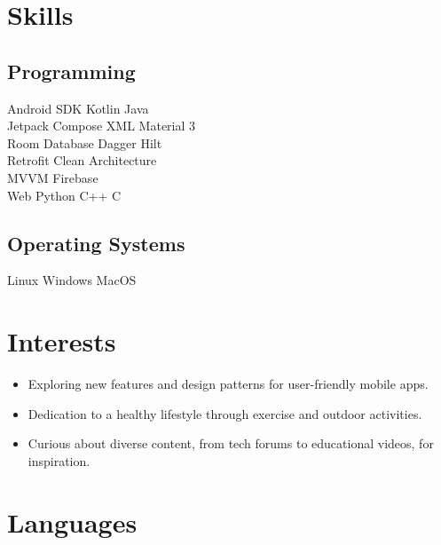 \documentclass[bold]{deedy-resume-openfont}
\begin{document}
\begin{minipage}[t]{0.33\textwidth}

\section{Skills}
\subsection{Programming}
Android SDK \textbullet{} Kotlin \textbullet{} Java \\
Jetpack Compose \textbullet{} XML \textbullet{} Material 3  \\
Room Database \textbullet{} Dagger Hilt \\ 
Retrofit \textbullet{} Clean Architecture \\ 
MVVM \textbullet{} Firebase  \\
Web \textbullet{} Python \textbullet{} C++ \textbullet{} C \\
\vspace{\topsep} %
\subsection{Operating Systems}
Linux \textbullet{} Windows \textbullet{} MacOS
\sectionsep


\section*{Interests}
\begin{itemize}[leftmargin=0pt]
    \item {} Exploring new features and design patterns for user-friendly mobile apps.
    \item {} Dedication to a healthy lifestyle through exercise and outdoor activities.
    \item {} Curious about diverse content, from tech forums to educational videos, for inspiration.
\end{itemize}




\section{Languages}

\end{minipage}
\end{document}
